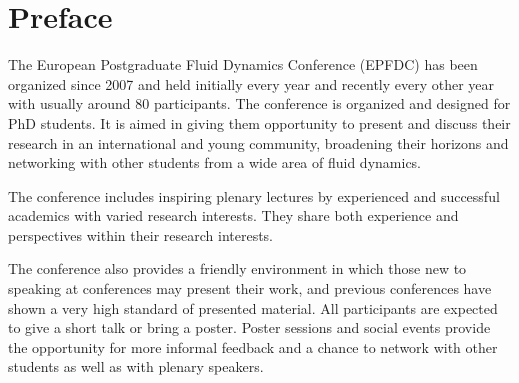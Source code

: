 \section*{Preface}

The European Postgraduate Fluid Dynamics Conference (EPFDC) has been organized since 2007 and held initially every year and recently every other year with usually around 80 participants. The conference is organized and designed for PhD students. It is aimed in giving them opportunity to present and discuss their research in an international and young community, broadening their horizons and networking with other students from a wide area of fluid dynamics.

The conference includes inspiring plenary lectures by experienced and successful academics with varied research interests. They share both experience and perspectives within their research interests.

The conference also provides a friendly environment in which those new to speaking at conferences may present their work, and previous conferences have shown a very high standard of presented material. All participants are expected to give a short talk or bring a poster. Poster sessions and social events provide the opportunity for more informal feedback and a chance to network with other students as well as with plenary speakers.
